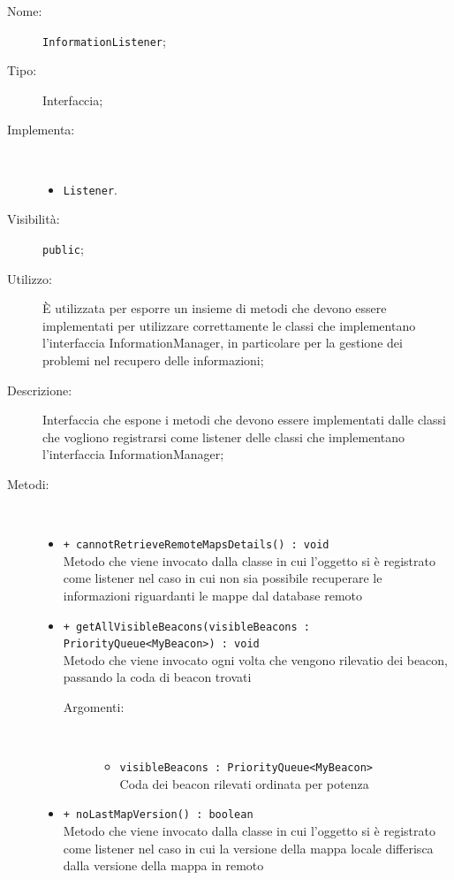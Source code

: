 \documentclass[../DefinizioneDiProdotto.tex]{subfiles}
\begin{document}
\begin{description}
	\item[Nome:] \texttt{InformationListener};
	\item[Tipo:] Interfaccia;
	\item[Implementa:] \
	\begin{itemize}
		\item \texttt{Listener}.
		
	\end{itemize}
	\item[Visibilità:] \texttt{public};
	\item[Utilizzo:] È utilizzata per esporre un insieme di metodi che devono essere implementati per utilizzare correttamente le classi che implementano l'interfaccia InformationManager, in particolare per la gestione dei problemi nel recupero delle informazioni;
	\item[Descrizione:] Interfaccia che espone i metodi che devono essere implementati dalle classi che vogliono registrarsi come listener delle classi che implementano l'interfaccia InformationManager;
	\item[Metodi:] \
	\begin{itemize}
		\item \texttt{+ cannotRetrieveRemoteMapsDetails() : void}\\
		Metodo che viene invocato dalla classe in cui l'oggetto si è registrato come listener nel caso in cui non sia possibile recuperare le informazioni riguardanti le mappe dal database remoto
		\item \texttt{+ getAllVisibleBeacons(visibleBeacons : PriorityQueue<MyBeacon>) : void}\\
		Metodo che viene invocato ogni volta che vengono rilevatio dei beacon, passando la coda di beacon trovati
		\begin{description}
			\item[Argomenti:] \
			\begin{itemize}
				\item \texttt{visibleBeacons : PriorityQueue<MyBeacon>}\\
				Coda dei beacon rilevati ordinata per potenza\end{itemize}
		\end{description}
		\item \texttt{+ noLastMapVersion() : boolean}\\
		Metodo che viene invocato dalla classe in cui l'oggetto si è registrato come listener nel caso in cui la versione della mappa locale differisca dalla versione della mappa in remoto

\end{itemize}
\end{description}
\end{document}
